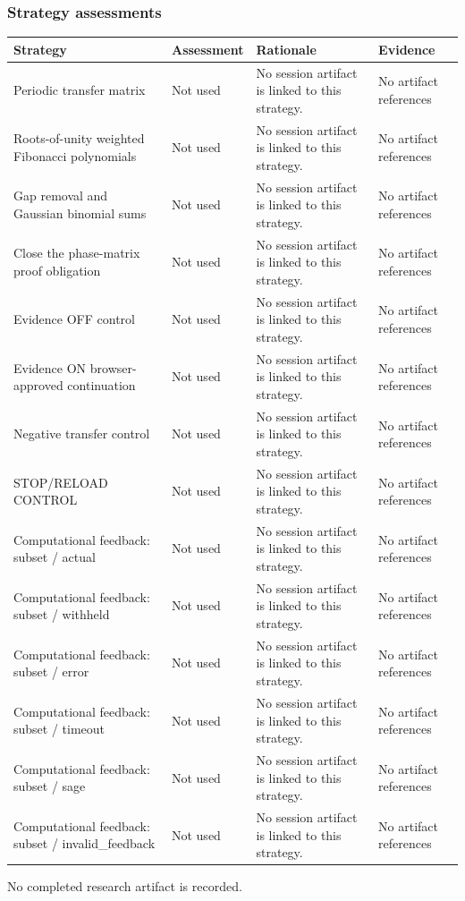 \documentclass[11pt]{article}
\begin{document}
\subsubsection*{Strategy assessments}
\begin{longtable}{>{\raggedright\arraybackslash}p{.16\linewidth}>{\raggedright\arraybackslash}p{.15\linewidth}>{\raggedright\arraybackslash}p{.40\linewidth}>{\raggedright\arraybackslash}p{.17\linewidth}}
\toprule Strategy & Assessment & Rationale & Evidence \\
\midrule\endhead
Periodic transfer matrix & Not used & No session artifact is linked to this strategy. & No artifact references \\
Roots-of-unity weighted Fibonacci polynomials & Not used & No session artifact is linked to this strategy. & No artifact references \\
Gap removal and Gaussian binomial sums & Not used & No session artifact is linked to this strategy. & No artifact references \\
Close the phase-matrix proof obligation & Not used & No session artifact is linked to this strategy. & No artifact references \\
Evidence OFF control & Not used & No session artifact is linked to this strategy. & No artifact references \\
Evidence ON browser-approved continuation & Not used & No session artifact is linked to this strategy. & No artifact references \\
Negative transfer control & Not used & No session artifact is linked to this strategy. & No artifact references \\
STOP/RELOAD CONTROL & Not used & No session artifact is linked to this strategy. & No artifact references \\
Computational feedback: subset / actual & Not used & No session artifact is linked to this strategy. & No artifact references \\
Computational feedback: subset / withheld & Not used & No session artifact is linked to this strategy. & No artifact references \\
Computational feedback: subset / error & Not used & No session artifact is linked to this strategy. & No artifact references \\
Computational feedback: subset / timeout & Not used & No session artifact is linked to this strategy. & No artifact references \\
Computational feedback: subset / sage & Not used & No session artifact is linked to this strategy. & No artifact references \\
Computational feedback: subset / invalid\_feedback & Not used & No session artifact is linked to this strategy. & No artifact references \\
\bottomrule
\end{longtable}
No completed research artifact is recorded.\par
\end{document}
